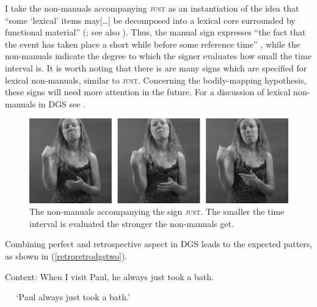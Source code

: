 I take the non-manuals accompanying \textsc{just} as an instantiation of the idea that ``some `lexical' items may$[$\dots$]$ be decomposed into a lexical core surrounded by functional material'' (\citealt[424]{shlonsky2010cartographic}; see also \citealt{kayne2005some, kayne2007several}). Thus, the manual sign expresses ``the fact that the event has taken place a short while before some reference time'' \citep[96]{cinque1999adverbs}, while the non-manuals indicate the degree to which the signer evaluates how small the time interval is. It is worth noting that there is are many signs which are specified for lexical non-manuals, similar to \textsc{just}. Concerning the bodily-mapping hypothesis, these signs will need more attention in the future. For a discussion of lexical non-manuals in DGS see \citet{pendzich2017lexicalnmms}.

\begin{figure}[bt]
\centering
	\includegraphics[width=1.0\textwidth]{just2sw.jpg}
	\caption{The non-manuals accompanying the sign \textsc{just}. The smaller the time interval is evaluated the stronger the non-manuals get.}
	\label{fig:just}
\end{figure}

Combining perfect and retrospective aspect in DGS leads to the expected patters, as shown in (\ref{retroretrodgstwo}).

\begin{exe}
\ex Context: When I visit Paul, he always just took a bath.\label{retroretrodgstwo}\begin{xlist} 
\ex \textcolor{white}{*}  
\ex *  
\glt \textcolor{white}{*}`Paul always just took a bath.' \label{ex:retroretrodgstwob}
\end{xlist}
\end{exe} 

